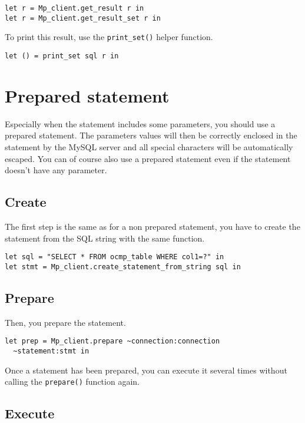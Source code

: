 \documentclass[a4paper, english, 11pt]{article}
\begin{document}
\begin{verbatim}
let r = Mp_client.get_result r in
let r = Mp_client.get_result_set r in
\end{verbatim}

To print this result, use the \texttt{print\_set()} helper function.

\begin{verbatim}
let () = print_set sql r in 
\end{verbatim}

\section{Prepared statement}

Especially when the statement includes some parameters, you should use a prepared statement. The parameters values will then be correctly enclosed in the statement by the MySQL server and all special characters will be automatically escaped. You can of course also use a prepared statement even if the statement doesn't have any parameter.

\subsection{Create}

The first step is the same as for a non prepared statement, you have to create the statement from the SQL string with the same function.

\begin{verbatim}
let sql = "SELECT * FROM ocmp_table WHERE col1=?" in
let stmt = Mp_client.create_statement_from_string sql in
\end{verbatim}

\subsection{Prepare}

Then, you prepare the statement.

\begin{verbatim}
let prep = Mp_client.prepare ~connection:connection
  ~statement:stmt in
\end{verbatim}

Once a statement has been prepared, you can execute it several times without calling the \texttt{prepare()} function again. 

\subsection{Execute}
\end{document}
